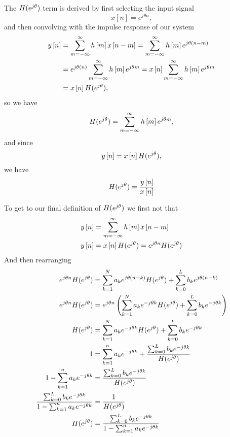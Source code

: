 \documentclass{article}
\def\lsqb{\left[}
\def\rsqb{\right]}
\def\sqb#1{\lsqb #1 \rsqb}
\def\xsig{x\sqb{n}}
\def\ysig{y\sqb{n}}
\begin{document}
The $H(e^{j\theta})$ term is derived by first selecting the input signal
\begin{equation}
    \xsig = e^{j\theta n},
\end{equation}
and then convolving with the impulse response of our system
\def\convsum{\sum_{m=-\infty}^{\infty}}
\begin{align}
    \ysig &= \convsum h\sqb{m} x\sqb{n-m} = \convsum h\sqb{m} e^{j\theta(n-m)} \\
          &= e^{j\theta(n)} \convsum h\sqb{m} e^{j\theta m} = \xsig \convsum h\sqb{m} e^{j\theta m} \\
          &= \xsig \hfun,
\end{align}
so we have
\begin{equation}
    \hfun = \convsum h\sqb{m} e^{j\theta m},
\end{equation}
and since
\begin{equation}
    \ysig = \xsig \hfun,
\end{equation}
we have
\begin{equation}
    \hfun = \frac{\ysig}{\xsig}
\end{equation}

To get to our final definition of $H(e^{j\theta})$ we first not that
\begin{align}
    \ysig &= \convsum h\sqb{m} x\sqb{n-m} \\
    \ysig &= \xsig \hfun = e^{j\theta n} \hfun
\end{align}
And then rearranging
\begin{align}
    e^{j\theta n} H(e^{j\theta}) &= \sum_{k=1}^{N} a_k e^{j\theta (n-k)} H(e^{j\theta}) + \sum_{k=0}^{L} b_k e^{j\theta(n-k)} \\
    e^{j\theta n} H(e^{j\theta}) &= e^{j\theta n} \left( \sum_{k=1}^{N} a_k e^{-j\theta k} H(e^{j\theta}) + \sum_{k=0}^{L} b_k e^{-j\theta k} \right)\\
    H(e^{j\theta}) &= \sum_{k=1}^{N} a_k e^{-j\theta k} H(e^{j\theta}) + \sum_{k=0}^{L} b_k e^{-j\theta k} \\
    1 &= \sum_{k=1}^{n} a_k e^{-j\theta k} + \frac{\sum_{k=0}^{L} b_k e^{-j\theta k}}{H(e^{j\theta})} \\
    1 - \sum_{k=1}^{n} a_k e^{-j\theta k} &= \frac{\sum_{k=0}^{L} b_k e^{-j\theta k}}{H(e^{j\theta})} \\
    \frac{\sum_{k=0}^{L} b_k e^{-j\theta k}}{1 - \sum_{k=1}^{n} a_k e^{-j\theta k}} &= \frac{1}{H(e^{j\theta})}\\
    H(e^{j\theta}) &= \frac{\sum_{k=0}^{L} b_k e^{-j\theta k}}{1 - \sum_{k=1}^{n} a_k e^{-j\theta k}}
\end{align}





\printindex
\end{document}
